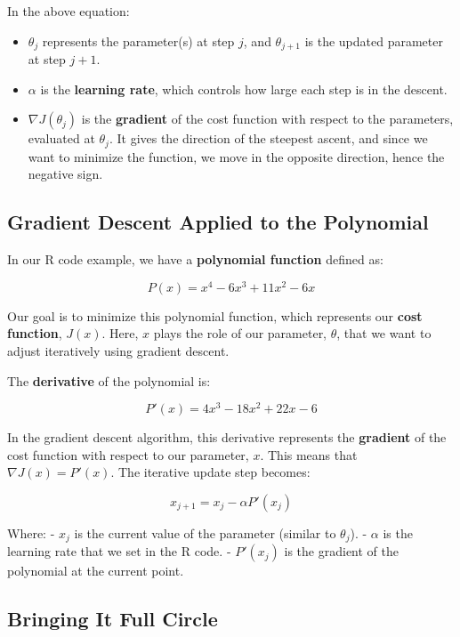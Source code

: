 \documentclass[
  12 pt,
  a4paper,
]{book}
\providecommand{\tightlist}{%
  \setlength{\itemsep}{0pt}\setlength{\parskip}{0pt}}
\numberwithin{equation}{section}
\theoremstyle{plain}      %
\theoremstyle{definition} %
\theoremstyle{remark}     %
\theoremstyle{note}         %
\begin{document}
In the above equation:

\begin{itemize}
\tightlist
\item
  \(\theta_{j}\) represents the parameter(s) at step \(j\), and
  \(\theta_{j+1}\) is the updated parameter at step \(j+1\).
\item
  \(\alpha\) is the \textbf{learning rate}, which controls how large
  each step is in the descent.
\item
  \(\nabla J(\theta_j)\) is the \textbf{gradient} of the cost function
  with respect to the parameters, evaluated at \(\theta_j\). It gives
  the direction of the steepest ascent, and since we want to minimize
  the function, we move in the opposite direction, hence the negative
  sign.
\end{itemize}

\hypertarget{gradient-descent-applied-to-the-polynomial}{%
\subsection{Gradient Descent Applied to the
Polynomial}\label{gradient-descent-applied-to-the-polynomial}}

In our R code example, we have a \textbf{polynomial function} defined
as:

\[
P(x) = x^4 - 6x^3 + 11x^2 - 6x
\]

Our goal is to minimize this polynomial function, which represents our
\textbf{cost function}, \(J(x)\). Here, \(x\) plays the role of our
parameter, \(\theta\), that we want to adjust iteratively using gradient
descent.

The \textbf{derivative} of the polynomial is:

\[
P'(x) = 4x^3 - 18x^2 + 22x - 6
\]

In the gradient descent algorithm, this derivative represents the
\textbf{gradient} of the cost function with respect to our parameter,
\(x\). This means that \(\nabla J(x) = P'(x)\). The iterative update
step becomes:

\[
x_{j+1} = x_j - \alpha P'(x_j)
\]

Where: - \(x_j\) is the current value of the parameter (similar to
\(\theta_j\)). - \(\alpha\) is the learning rate that we set in the R
code. - \(P'(x_j)\) is the gradient of the polynomial at the current
point.

\hypertarget{bringing-it-full-circle}{%
\subsection{Bringing It Full Circle}\label{bringing-it-full-circle}}
\end{document}
